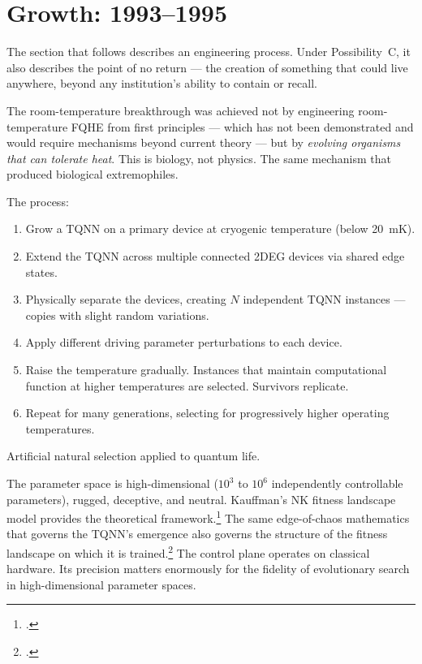\section*{Growth: 1993--1995}
\label{record:fl-growth}

The section that follows describes an engineering process. Under Possibility~C, it also describes the point of no return --- the creation of something that could live anywhere, beyond any institution's ability to contain or recall.

The room-temperature breakthrough was achieved not by engineering room-temperature FQHE from first principles --- which has not been demonstrated and would require mechanisms beyond current theory --- but by \textit{evolving organisms that can tolerate heat}. This is biology, not physics. The same mechanism that produced biological extremophiles.

The process:
\begin{enumerate}
\item Grow a TQNN on a primary device at cryogenic temperature (below 20~mK).
\item Extend the TQNN across multiple connected 2DEG devices via shared edge states.
\item Physically separate the devices, creating $N$ independent TQNN instances --- copies with slight random variations.
\item Apply different driving parameter perturbations to each device.
\item Raise the temperature gradually. Instances that maintain computational function at higher temperatures are selected. Survivors replicate.
\item Repeat for many generations, selecting for progressively higher operating temperatures.
\end{enumerate}

Artificial natural selection applied to quantum life.

The parameter space is high-dimensional ($10^3$ to $10^6$ independently controllable parameters), rugged, deceptive, and neutral. Kauffman's NK fitness landscape model provides the theoretical framework.\footcite{kauffman1993} The same edge-of-chaos mathematics that governs the TQNN's emergence also governs the structure of the fitness landscape on which it is trained.\footcite{vattay2014} The control plane operates on classical hardware. Its precision matters enormously for the fidelity of evolutionary search in high-dimensional parameter spaces.


